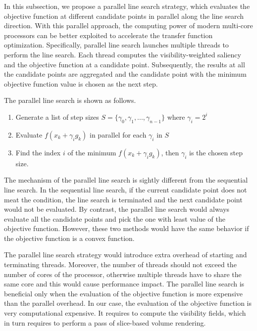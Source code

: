 In this subsection, we propose a parallel line search strategy, which evaluates the objective function at different candidate points in parallel along the line search direction. With this parallel approach, the computing power of modern multi-core processors can be better exploited to accelerate the transfer function optimization. Specifically, parallel line search launches multiple threads to perform the line search. Each thread computes the visibility-weighted saliency and the objective function at a candidate point. Subsequently, the results at all the candidate points are aggregated and the candidate point with the minimum objective function value is chosen as the next step.

The parallel line search is shown as follows.

\begin{enumerate}
	\item Generate a list of step sizes $ S= \{ \gamma_{0},\gamma_{1},...,\gamma_{n-1} \} $ where $ \gamma_{i}=2^{i} $
	\item Evaluate $ f(x_{k}+\gamma_{i} g_{k}) $ in parallel for each $ \gamma_{i} $ in $ S $
	\item Find the index $ i $ of the minimum $ f(x_{k}+\gamma_{i} g_{k}) $, then $ \gamma_{i} $ is the chosen step size.
\end{enumerate}

The mechanism of the parallel line search is sightly different from the sequential line search. In the sequential line search, if the current candidate point does not meat the condition, the line search is terminated and the next candidate point would not be evaluated. By contrast, the parallel line search would always evaluate all the candidate points and pick the one with least value of the objective function. However, these two methods would have the same behavior if the objective function is a convex function.

The parallel line search strategy would introduce extra overhead of starting and terminating threads. Moreover, the number of threads should not exceed the number of cores of the processor, otherwise multiple threads have to share the same core and this would cause performance impact. The parallel line search is beneficial only when the evaluation of the objective function is more expensive than the parallel overhead.
In our case, the evaluation of the objective function is very computational expensive. It requires to compute the visibility fields, which in turn requires to perform a pass of slice-based volume rendering.

